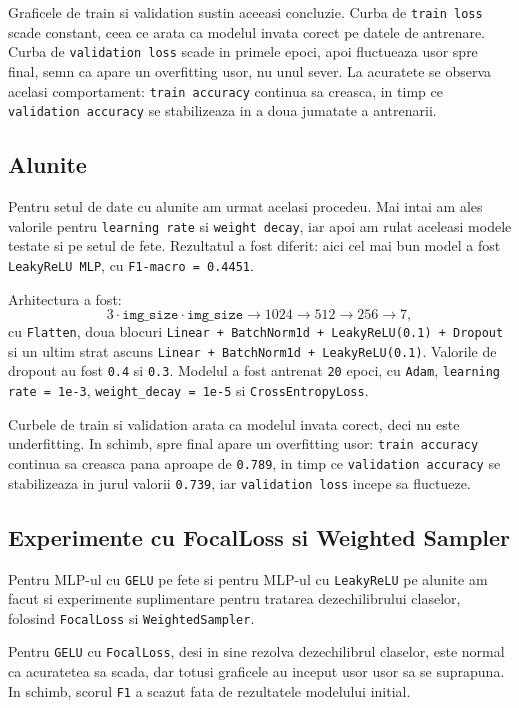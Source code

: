 \documentclass[12pt,a4paper]{article}
\begin{document}
Graficele de train si validation sustin aceeasi concluzie. Curba de \texttt{train loss} scade constant, ceea ce arata ca modelul invata corect pe datele de antrenare. Curba de \texttt{validation loss} scade in primele epoci, apoi fluctueaza usor spre final, semn ca apare un overfitting usor, nu unul sever. La acuratete se observa acelasi comportament: \texttt{train accuracy} continua sa creasca, in timp ce \texttt{validation accuracy} se stabilizeaza in a doua jumatate a antrenarii.

\subsection{Alunite}

Pentru setul de date cu alunite am urmat acelasi procedeu. Mai intai am ales valorile pentru \texttt{learning rate} si \texttt{weight decay}, iar apoi am rulat aceleasi modele testate si pe setul de fete. Rezultatul a fost diferit: aici cel mai bun model a fost \texttt{LeakyReLU MLP}, cu \texttt{F1-macro = 0.4451}.

Arhitectura a fost:
\[
3 \cdot \texttt{img\_size} \cdot \texttt{img\_size} \rightarrow 1024 \rightarrow 512 \rightarrow 256 \rightarrow 7,
\]
cu \texttt{Flatten}, doua blocuri \texttt{Linear + BatchNorm1d + LeakyReLU(0.1) + Dropout} si un ultim strat ascuns \texttt{Linear + BatchNorm1d + LeakyReLU(0.1)}. Valorile de dropout au fost \texttt{0.4} si \texttt{0.3}. Modelul a fost antrenat \texttt{20} epoci, cu \texttt{Adam}, \texttt{learning rate = 1e-3}, \texttt{weight\_decay = 1e-5} si \texttt{CrossEntropyLoss}.

Curbele de train si validation arata ca modelul invata corect, deci nu este underfitting. In schimb, spre final apare un overfitting usor: \texttt{train accuracy} continua sa creasca pana aproape de \texttt{0.789}, in timp ce \texttt{validation accuracy} se stabilizeaza in jurul valorii \texttt{0.739}, iar \texttt{validation loss} incepe sa fluctueze.

\subsection{Experimente cu FocalLoss si Weighted Sampler}

Pentru MLP-ul cu \texttt{GELU} pe fete si pentru MLP-ul cu \texttt{LeakyReLU} pe alunite am facut si experimente suplimentare pentru tratarea dezechilibrului claselor, folosind \texttt{FocalLoss} si \texttt{WeightedSampler}.

Pentru \texttt{GELU} cu \texttt{FocalLoss}, desi in sine rezolva dezechilibrul claselor, este normal ca acuratetea sa scada, dar totusi graficele au inceput usor usor sa se suprapuna. In schimb, scorul \texttt{F1} a scazut fata de rezultatele modelului initial.
\end{document}
